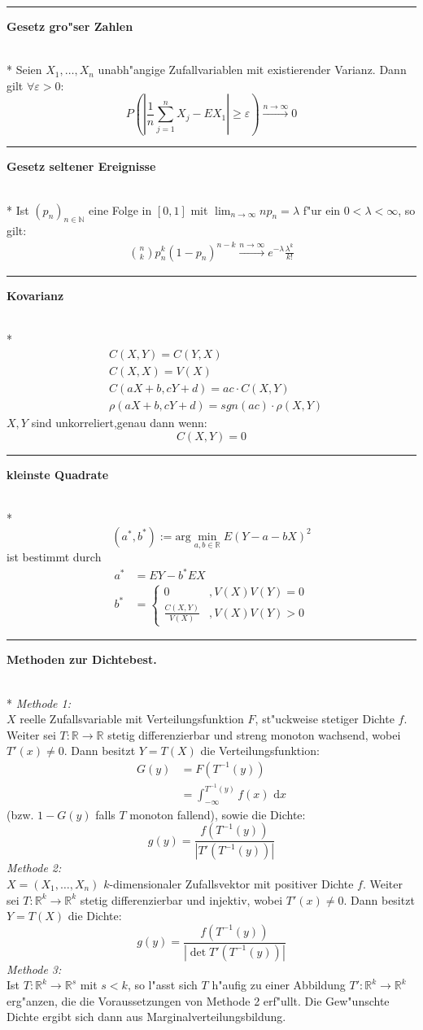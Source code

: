 \documentclass{article}
\newcommand{\hh}[1]{{\vspace{1pt}\hrule\vspace{1pt} \noindent\textbf{#1}}\\*}
\newcommand{\hhh}[1]{{\vspace{1pt}\noindent\emph{#1:}}}
\begin{document}
\begin{multicols}{4}
\hh{Gesetz gro"ser Zahlen}
Seien $X_1,\ldots,X_n$ unabh"angige Zufallvariablen mit existierender Varianz. Dann gilt $\forall\varepsilon>0$:
\[P\left(\left|\frac1n\sum_{j=1}^n X_j-EX_1\right|\ge\varepsilon\right)\stackrel{n\to\infty}\to 0\]

\hh{Gesetz seltener Ereignisse}
Ist $(p_n)_{n\in\mathbb{N}}$ eine Folge in $[0,1]$ mit $\lim_{n\to\infty} np_n=\lambda$ f"ur ein $0<\lambda<\infty$, so gilt:
\begin{align*}
{n\choose k}p_n^k(1-p_n)^{n-k}\stackrel{n\to\infty}\to e^{-\lambda}\frac{\lambda^k}{k!}
\end{align*}

\hh{Kovarianz}
\begin{align*}
&C(X,Y)=C(Y,X)\\
&C(X,X)=V(X)\\
&C(aX+b,cY+d)=ac\cdot C(X,Y)\\
&\rho(aX+b,cY+d)=sgn(ac)\cdot\rho(X,Y)
\end{align*}
$X,Y$ sind unkorreliert,genau dann wenn:
\[C(X,Y)=0\]

\hh{kleinste Quadrate}
\[(a^*,b^*):=\text{arg}\min_{a,b\in\mathbb{R}} E(Y-a-bX)^2\]
ist bestimmt durch
\begin{align*}
a^*&= EY-b^*EX\\
b^*&=\begin{cases} 0&, V(X)V(Y)=0\\ \frac{C(X,Y)}{V(X)}&, V(X)V(Y)>0\end{cases}
\end{align*}

\hh{Methoden zur Dichtebest.}
\hhh{Methode 1}\\
$X$ reelle Zufallsvariable mit Verteilungsfunktion $F$, st"uckweise stetiger Dichte $f$. Weiter sei $T:\mathbb{R}\to\mathbb{R}$ stetig differenzierbar und streng monoton wachsend, wobei $T'(x)\ne 0$. Dann besitzt $Y=T(X)$ die Verteilungsfunktion:
\begin{align*}
G(y)&=F(T^{-1}(y))\\
&=\int_{-\infty}^{T^{-1}(y)} f(x)\text{ d}x
\end{align*}
(bzw. $1-G(y)$ falls $T$ monoton fallend), sowie die Dichte:
\[g(y)=\frac{f(T^{-1}(y))}{|T'(T^{-1}(y))|}\]
\hhh{Methode 2}\\
$X=(X_1,\ldots,X_n)$ $k$-dimensionaler Zufallsvektor mit positiver Dichte $f$. Weiter sei $T:\mathbb{R}^k\to\mathbb{R}^k$ stetig differenzierbar und injektiv, wobei $T'(x)\ne 0$. Dann besitzt $Y=T(X)$ die Dichte:
\[g(y)=\frac{f(T^{-1}(y))}{|\det T'(T^{-1}(y))|}\]
\hhh{Methode 3}\\
Ist $T:\mathbb{R}^k\to\mathbb{R}^s$ mit $s<k$, so l"asst sich $T$ h"aufig zu einer Abbildung $T':\mathbb{R}^k\to\mathbb{R}^k$ erg"anzen, die die Voraussetzungen von Methode 2 erf"ullt. Die Gew"unschte Dichte ergibt sich dann aus Marginalverteilungsbildung. 


\end{multicols}
\end{document}
